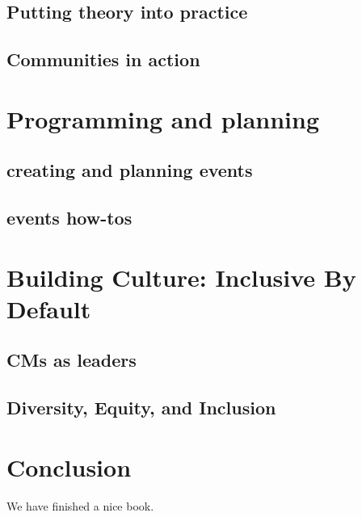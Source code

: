 \documentclass[]{book}
\begin{document}
\hypertarget{putting-theory-into-practice}{%
\section{Putting theory into practice}\label{putting-theory-into-practice}}

\hypertarget{communities-in-action}{%
\section{Communities in action}\label{communities-in-action}}

\hypertarget{program}{%
\chapter{Programming and planning}\label{program}}

\hypertarget{creating-and-planning-events}{%
\section{creating and planning events}\label{creating-and-planning-events}}

\hypertarget{events-how-tos}{%
\section{events how-tos}\label{events-how-tos}}

\hypertarget{building-culture-inclusive-by-default}{%
\chapter{Building Culture: Inclusive By Default}\label{building-culture-inclusive-by-default}}

\hypertarget{cms-as-leaders}{%
\section{CMs as leaders}\label{cms-as-leaders}}

\hypertarget{diversity-equity-and-inclusion}{%
\section{Diversity, Equity, and Inclusion}\label{diversity-equity-and-inclusion}}

\hypertarget{conclusion}{%
\chapter{Conclusion}\label{conclusion}}

We have finished a nice book.


\end{document}
